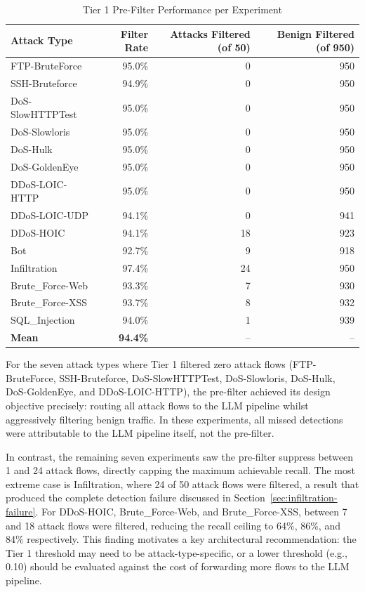 \begin{table}[H]
\centering
\caption{Tier 1 Pre-Filter Performance per Experiment}
\label{tab:tier1-performance}
\small
\begin{tabular}{l r r r}
\toprule
Attack Type & Filter Rate & Attacks Filtered (of 50) & Benign Filtered (of 950) \\
\midrule
FTP-BruteForce & 95.0\% & 0 & 950 \\
SSH-Bruteforce & 94.9\% & 0 & 950 \\
DoS-SlowHTTPTest & 95.0\% & 0 & 950 \\
DoS-Slowloris & 95.0\% & 0 & 950 \\
DoS-Hulk & 95.0\% & 0 & 950 \\
DoS-GoldenEye & 95.0\% & 0 & 950 \\
DDoS-LOIC-HTTP & 95.0\% & 0 & 950 \\
DDoS-LOIC-UDP & 94.1\% & 0 & 941 \\
DDoS-HOIC & 94.1\% & 18 & 923 \\
Bot & 92.7\% & 9 & 918 \\
Infiltration & 97.4\% & 24 & 950 \\
Brute\_Force-Web & 93.3\% & 7 & 930 \\
Brute\_Force-XSS & 93.7\% & 8 & 932 \\
SQL\_Injection & 94.0\% & 1 & 939 \\
\midrule
\textbf{Mean} & \textbf{94.4\%} & -- & -- \\
\bottomrule
\end{tabular}
\end{table}

For the seven attack types where Tier 1 filtered zero attack flows (FTP-BruteForce, SSH-Bruteforce, DoS-SlowHTTPTest, DoS-Slowloris, DoS-Hulk, DoS-GoldenEye, and DDoS-LOIC-HTTP), the pre-filter achieved its design objective precisely: routing all attack flows to the LLM pipeline whilst aggressively filtering benign traffic. In these experiments, all missed detections were attributable to the LLM pipeline itself, not the pre-filter.

In contrast, the remaining seven experiments saw the pre-filter suppress between 1 and 24 attack flows, directly capping the maximum achievable recall. The most extreme case is Infiltration, where 24 of 50 attack flows were filtered, a result that produced the complete detection failure discussed in Section~\ref{sec:infiltration-failure}. For DDoS-HOIC, Brute\_Force-Web, and Brute\_Force-XSS, between 7 and 18 attack flows were filtered, reducing the recall ceiling to 64\%, 86\%, and 84\% respectively. This finding motivates a key architectural recommendation: the Tier 1 threshold may need to be attack-type-specific, or a lower threshold (e.g., 0.10) should be evaluated against the cost of forwarding more flows to the LLM pipeline.

